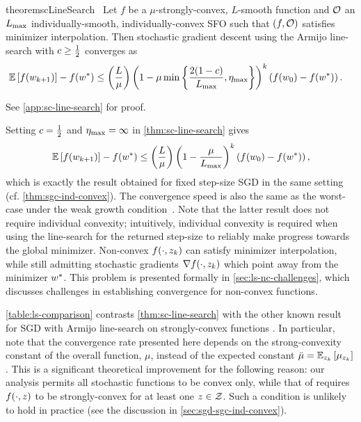 \begin{restatable}{theorem}{scLineSearch}~\label{thm:sc-line-search}
    Let \( f \) be a \( \mu \)-strongly-convex, \( L \)-smooth function and \( \oracle{} \) an \( \Lmax \) individually-smooth, individually-convex \ac{SFO} such that \( \rbr{f, \oracle{}} \) satisfies minimizer interpolation.
    Then stochastic gradient descent using the Armijo line-search with \( c \geq \half \) converges as
    \begin{align*}
        \E \sbr{f(\wkk)} - f(\wopt) &\leq \rbr{\frac{L}{\mu}}\rbr{1 - \mu \min\cbr{\frac{2(1-c)}{\Lmax}, \etamax}}^k \rbr{f(w_0) - f(\wopt)}. 
    \end{align*}
\end{restatable}%
\noindent See \autoref{app:sc-line-search} for proof. \hfill \break

Setting \( c = \half \) and \( \etamax = \infty \) in \autoref{thm:sc-line-search} gives  
\[\E \sbr{f(\wkk)} - f(\wopt) \leq \rbr{\frac{L}{\mu}}\rbr{1 - \frac{\mu}{\Lmax}}^k \rbr{f(w_0) - f(\wopt)}, \]
which is exactly the result obtained for fixed step-size \ac{SGD} in the same setting (cf. \autoref{thm:sgc-ind-convex}). 
The convergence speed is also the same as the worst-case under the weak growth condition~\citep[Theorem 5]{vaswani2019fast}.
Note that the latter result does not require individual convexity; intuitively, individual convexity is required when using the line-search for the returned step-size to reliably make progress towards the global minimizer.
Non-convex \( f(\cdot, \zk) \) can satisfy minimizer interpolation, while still admitting stochastic gradients \( \grad(\cdot, \zk) \) which point away from the minimizer \( \wopt \).
This problem is presented formally in \autoref{sec:ls-nc-challenges}, which discusses challenges in establishing convergence for non-convex functions.

\autoref{table:ls-comparison} contrasts \autoref{thm:sc-line-search} with the other known result for \ac{SGD} with Armijo line-search on strongly-convex functions \citep[Theorem 1]{vaswani2019painless}. 
In particular, note that the convergence rate presented here depends on the strong-convexity constant of the overall function, \( \mu \), instead of the expected constant \( \bar \mu = \Ek \sbr{\mu_{\zk}} \).
This is a significant theoretical improvement for the following reason: our analysis permits all stochastic functions to be convex only, while that of \citet{vaswani2019painless} requires \( f(\cdot, \z) \) to be strongly-convex for at least one \( \z \in \calZ \).
Such a condition is unlikely to hold in practice (see the discussion in \autoref{sec:sgd-sgc-ind-convex}).

